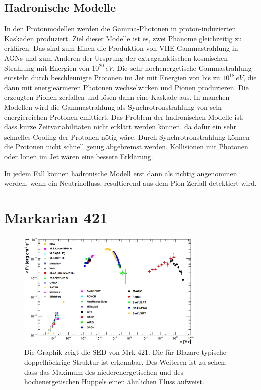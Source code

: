 \subsection{Hadronische Modelle}
In den Protonmodellen werden die Gamma-Photonen in proton-induzierten Kaskaden produziert. 
Ziel dieser Modelle ist es, zwei Phänome gleichzeitig zu erklären: 
Das sind zum Einen die Produktion von VHE-Gammastrahlung in AGNs und zum Anderen der Ursprung der extragalaktischen kosmischen Strahlung mit Energien von $10^{20}\,\si{eV}$.
Die sehr hochenergetische Gammastrahlung entsteht durch beschleunigte Protonen im Jet mit Energien von bis zu $10^{18}\,\si{eV}$, die dann mit energieärmeren Photonen wechselwirken und Pionen produzieren.
Die erzeugten Pionen zerfallen und lösen dann eine Kaskade aus.
In manchen Modellen wird die Gammastrahlung als Synchrotronstrahlung von sehr energiereichen Protonen emittiert.
Das Problem der hadronischen Modelle ist, dass kurze Zeitvariabilitäten nicht erklärt werden können, da dafür ein sehr schnelles Cooling der Protonen nötig wäre. 
Durch Synchrotronstrahlung können die Protonen nicht schnell genug abgebremst werden.
Kollisionen mit Photonen oder Ionen im Jet wären eine bessere Erklärung.\cite{Weekes}

In jedem Fall können hadronische Modell erst dann als richtig angenommen werden, wenn ein Neutrinofluss, resultierend aus dem Pion-Zerfall detektiert wird.\cite{Weekes}




\section{Markarian 421}
\label{sec:Mrk421}

\begin{figure}
    \centering
    \includegraphics[width=0.8\textwidth]{./Plots/02_Astroteilchenphysik/SED_Mrk421.png}
    \caption{Die Graphik zeigt die SED von Mrk 421. Die für Blazare typische doppelhöckrige Struktur ist erkennbar. 
     Des Weiteren ist zu sehen, dass das Maximum des niederenergetischen und des hochenergetischen Huppels einen ähnlichen Fluss aufweist.\cite{Mrk421_SED}}
    \label{Mrk_SED}
\end{figure}

